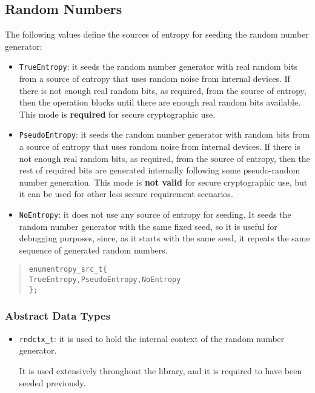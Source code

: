 \documentclass[a4paper]{article}
\newenvironment{code}%
{\begin{quote}\footnotesize\begin{alltt}}%
{\end{alltt}\end{quote}}%
\begin{document}
\subsection{Random Numbers}

The following values define the sources of entropy for seeding the
random number generator:

{\footnotesize\begin{itemize}%
\item \verb|TrueEntropy|: it seeds the random number generator with
  real random bits from a source of entropy that uses random noise
  from internal devices. If there is not enough real random bits, as
  required, from the source of entropy, then the operation blocks
  until there are enough real random bits available. This mode is
  \textbf{required} for secure cryptographic use.
\item \verb|PseudoEntropy|: it seeds the random number generator with
  random bits from a source of entropy that uses random noise from
  internal devices. If there is not enough real random bits, as
  required, from the source of entropy, then the rest of required bits
  are generated internally following some pseudo-random number
  generation. This mode is \textbf{not valid} for secure cryptographic
  use, but it can be used for other less secure requirement scenarios.
\item \verb|NoEntropy|: it does not use any source of entropy for
  seeding. It seeds the random number generator with the same fixed
  seed, so it is useful for debugging purposes, since, as it starts
  with the same seed, it repeats the same sequence of generated random
  numbers.
\end{itemize}}%
\begin{code}
enum entropy_src_t \{
    TrueEntropy, PseudoEntropy, NoEntropy
\};
\end{code}

\subsubsection*{Abstract Data Types}
\begin{itemize}\small
\item \verb|rndctx_t|: it is used to hold the internal context of the
  random number generator. 

  It is used extensively throughout the library, and it is required to
  have been seeded previously.
\end{itemize}
\end{document}
